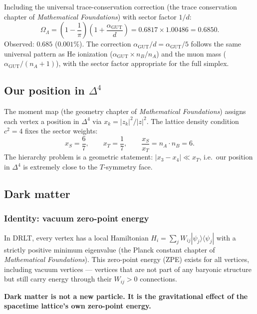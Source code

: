 Including the universal trace-conservation correction (the trace conservation chapter of \textit{Mathematical Foundations}) with sector factor $1/d$:
\begin{equation}
\boxed{\Omega_\Lambda = \left(1 - \frac{1}{\pi}\right)\!\left(1 + \frac{\alpha_\mathrm{GUT}}{d}\right) = 0.6817 \times 1.00486 = 0.6850.}
\end{equation}
Observed: $0.685$ ($0.001\%$).  The correction $\alpha_\mathrm{GUT}/d = \alpha_\mathrm{GUT}/5$ follows the same universal pattern as He ionization ($\alpha_\mathrm{GUT} \times n_B/n_A$) and the muon mass ($\alpha_\mathrm{GUT}/(n_A+1)$), with the sector factor appropriate for the full simplex.

\subsection{Our position in $\Delta^4$}
\label{sec:our_position}

The moment map (the geometry chapter of \textit{Mathematical Foundations}) assigns each vertex a position in $\Delta^4$ via $x_k = |z_k|^2/|z|^2$.  The lattice density condition $c^2 = 4$ fixes the sector weights:
\begin{equation}
x_S = \frac{6}{7}, \qquad x_T = \frac{1}{7}, \qquad \frac{x_S}{x_T} = n_A \cdot n_B = 6.
\end{equation}
The hierarchy problem is a geometric statement: $|x_3 - x_4| \ll x_T$, i.e.\ our position in $\Delta^4$ is extremely close to the $T$-symmetry face.

\subsection{Dark matter}

\subsubsection{Identity: vacuum zero-point energy}

In DRLT, every vertex has a local Hamiltonian $H_i = \sum_j W_{ij}|\psi_j\rangle\langle\psi_j|$ with a strictly positive minimum eigenvalue (the Planck constant chapter of \textit{Mathematical Foundations}). This zero-point energy (ZPE) exists for all vertices, including vacuum vertices --- vertices that are not part of any baryonic structure but still carry energy through their $W_{ij} > 0$ connections.

\textbf{Dark matter is not a new particle. It is the gravitational effect of the spacetime lattice's own zero-point energy.}

